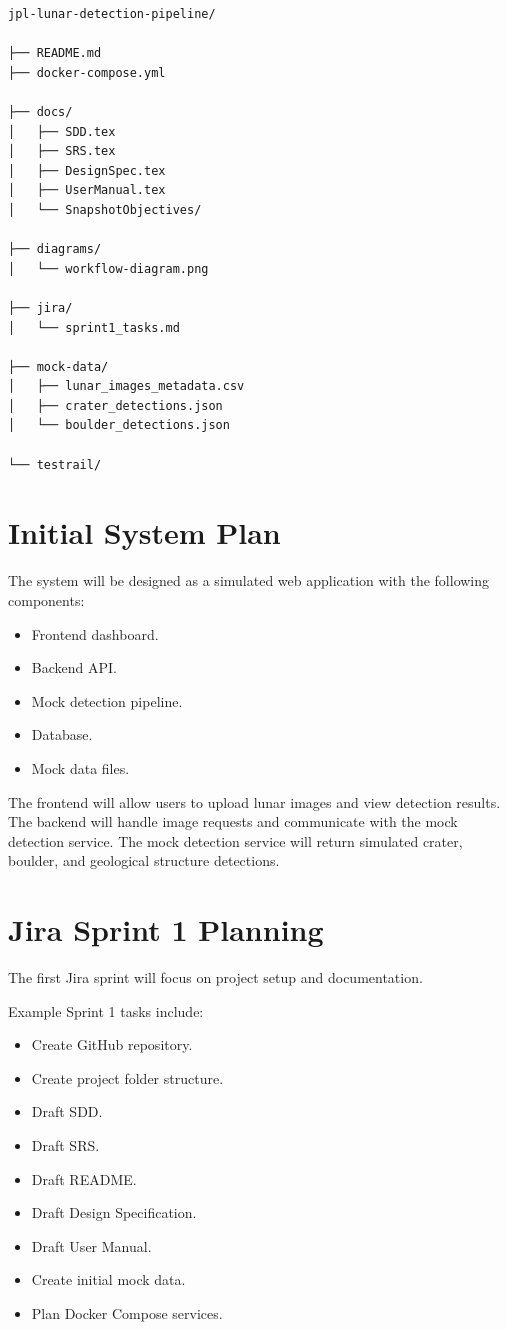 \documentclass[12pt]{article}
\begin{document}
\begin{verbatim}
jpl-lunar-detection-pipeline/

├── README.md
├── docker-compose.yml

├── docs/
│   ├── SDD.tex
│   ├── SRS.tex
│   ├── DesignSpec.tex
│   ├── UserManual.tex
│   └── SnapshotObjectives/

├── diagrams/
│   └── workflow-diagram.png

├── jira/
│   └── sprint1_tasks.md

├── mock-data/
│   ├── lunar_images_metadata.csv
│   ├── crater_detections.json
│   └── boulder_detections.json

└── testrail/
\end{verbatim}

\section{Initial System Plan}

The system will be designed as a simulated web application with the following components:

\begin{itemize}
    \item Frontend dashboard.
    \item Backend API.
    \item Mock detection pipeline.
    \item Database.
    \item Mock data files.
\end{itemize}

The frontend will allow users to upload lunar images and view detection results. The backend will handle image requests and communicate with the mock detection service. The mock detection service will return simulated crater, boulder, and geological structure detections.

\section{Jira Sprint 1 Planning}

The first Jira sprint will focus on project setup and documentation.

Example Sprint 1 tasks include:

\begin{itemize}
    \item Create GitHub repository.
    \item Create project folder structure.
    \item Draft SDD.
    \item Draft SRS.
    \item Draft README.
    \item Draft Design Specification.
    \item Draft User Manual.
    \item Create initial mock data.
    \item Plan Docker Compose services.
\end{itemize}
\end{document}
